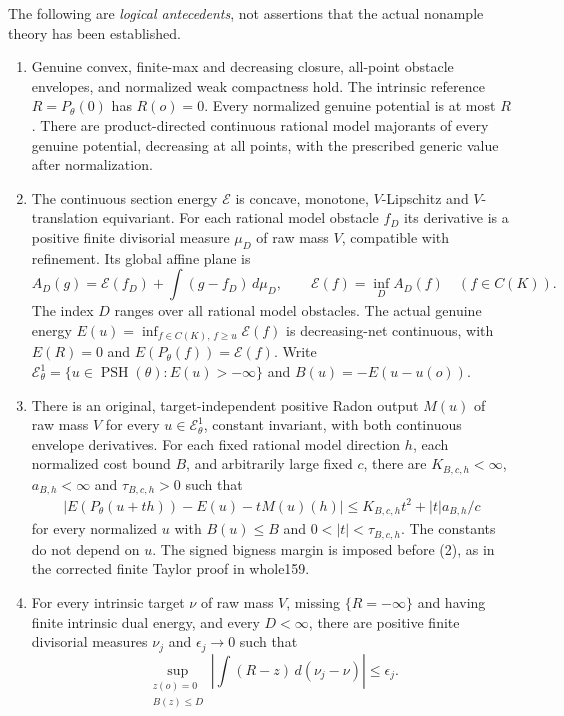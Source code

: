\documentclass[11pt]{article}
\newcommand{\EE}{\mathcal E^1_\theta}
\newcommand{\PSH}{\operatorname{PSH}}
\begin{document}
The following are \emph{logical antecedents}, not assertions that
the actual nonample theory has been established.
\begin{enumerate}
\item Genuine convex, finite-max and decreasing closure, all-point
obstacle envelopes, and normalized weak compactness hold.
The intrinsic reference $R=P_\theta(0)$ has $R(o)=0$.
Every normalized genuine potential is at most $R$.
There are product-directed continuous rational model majorants
of every genuine potential, decreasing at all points, with the
prescribed generic value after normalization.
\item The continuous section energy $\mathscr E$ is concave,
monotone, $V$-Lipschitz and $V$-translation equivariant.
For each rational model obstacle $f_D$ its derivative is a positive
finite divisorial measure $\mu_D$ of raw mass $V$, compatible with
refinement. Its global affine plane is
\[
 A_D(g)=\mathscr E(f_D)+\int(g-f_D)\,d\mu_D,
 \qquad \mathscr E(f)=\inf_D A_D(f)\quad(f\in C(K)).
                                                        \tag{1}
\]
The index $D$ ranges over all rational model obstacles.
The actual genuine energy
$E(u)=\inf_{f\in C(K),\,f\geq u}\mathscr E(f)$ is decreasing-net
continuous, with $E(R)=0$ and $E(P_\theta(f))=\mathscr E(f)$.
Write $\EE=\{u\in\PSH(\theta):E(u)>-\infty\}$ and
$B(u)=-E(u-u(o))$.
\item There is an original, target-independent positive Radon
output $M(u)$ of raw mass $V$ for every $u\in\EE$,
constant invariant, with both continuous envelope derivatives.
For each fixed rational model direction $h$, each normalized
cost bound $B$, and arbitrarily large fixed $c$, there are
$K_{B,c,h}<\infty$, $a_{B,h}<\infty$ and $\tau_{B,c,h}>0$ such that
\[
\begin{split}
\big|E(P_\theta(u+th))-E(u)-tM(u)(h)\big|
 \leq K_{B,c,h}t^2+|t|a_{B,h}/c
\end{split}                                             \tag{2}
\]
for every normalized $u$ with $B(u)\leq B$ and
$0<|t|<\tau_{B,c,h}$. The constants do not depend on $u$.
The signed bigness margin is imposed before (2), as in
the corrected finite Taylor proof in whole159.
\item For every intrinsic target $\nu$ of raw mass $V$,
missing $\{R=-\infty\}$ and having finite intrinsic dual energy,
and every $D<\infty$, there are positive finite divisorial
measures $\nu_j$ and $\epsilon_j\to0$ such that
\[
 \sup_{\substack{z(o)=0\\B(z)\leq D}}
 \left|\int(R-z)\,d(\nu_j-\nu)\right|\leq\epsilon_j.
\]
\end{enumerate}
\end{document}
